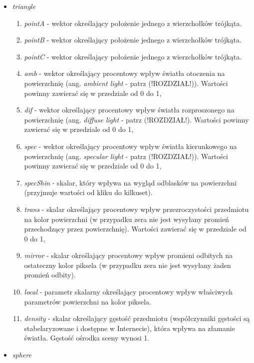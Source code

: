 \begin{itemize}
\item \emph{triangle}

	\begin{enumerate}
		\item \emph{pointA} - wektor określający położenie jednego z wierzchołków trójkąta.
		\item \emph{pointB} - wektor określający położenie jednego z wierzchołków trójkąta.
		\item \emph{pointC} - wektor określający położenie jednego z wierzchołków trójkąta.
		\item \emph{amb} - wektor określający procentowy wpływ światła otoczenia na powierzchnię (ang. \emph{ambient light} - patrz (!ROZDZIAŁ!)). Wartości powinny zawierać się w przedziale od 0 do 1,
		\item \emph{dif} - wektor określający procentowy wpływ światła rozproszonego na powierzchnię (ang. \emph{diffuse light} - patrz (!ROZDZIAŁ!). Wartości powinny zawierać się w przedziale od 0 do 1,
		\item \emph{spec} - wektor określający procentowy wpływ światła kierunkowego na powierzchnię (ang. \emph{specular light} - patrz (!ROZDZIAŁ!)). Wartości powinny zawierać się w przedziale od 0 do 1,
		\item \emph{specShin} - skalar, który wpływa na wygląd odblasków na powierzchni (przyjmuje wartości od kliku do kilkuset).
		\item \emph{trans} - skalar określający procentowy wpływ przezroczystości przedmiotu na kolor powierzchni (w przypadku zera nie jest wysyłany promień przechodzący przez powierzchnię). Wartości zawierać się w przedziale od 0 do 1,
		\item \emph{mirror} - skalar określający procentowy wpływ promieni odbitych na ostateczny kolor piksela (w przypadku zera nie jest wysyłany żaden promień odbity).
		\item \emph{local} - parametr skalarny określający procentowy wpływ właściwych parametrów powierzchni na kolor piksela.
		\item \emph{density} - skalar określający gęstość przedmiotu (współczynniki gęstości są stabelaryzowane i dostępne w Internecie), która wpływa na złamanie światła. Gęstość ośrodka sceny wynosi 1.
	\end{enumerate}

\item \emph{sphere}


\end{itemize}
